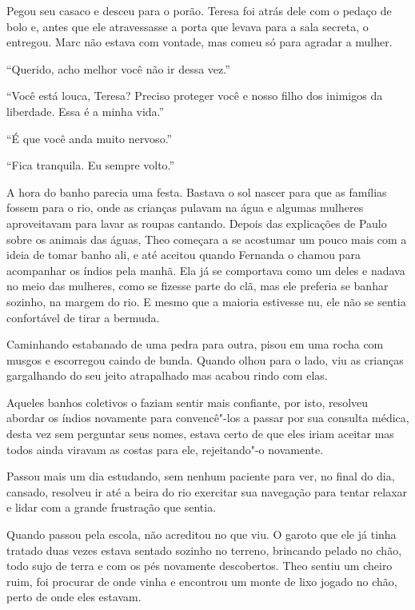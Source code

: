 Pegou seu casaco e desceu para o porão. Teresa foi atrás dele com o
pedaço de bolo e, antes que ele atravessasse a porta que levava para a
sala secreta, o entregou. Marc não estava com vontade, mas comeu só para
agradar a mulher.

``Querido, acho melhor você não ir dessa vez.''

``Você está louca, Teresa? Preciso proteger você e nosso filho dos
inimigos da liberdade. Essa é a minha vida.''

``É que você anda muito nervoso.''

``Fica tranquila. Eu sempre volto.''

\asterisc


A hora do banho parecia uma festa. Bastava o sol nascer para que as
famílias fossem para o rio, onde as crianças pulavam na água e algumas
mulheres aproveitavam para lavar as roupas cantando. Depois das
explicações de Paulo sobre os animais das águas, Theo começara a se
acostumar um pouco mais com a ideia de tomar banho ali, e até aceitou
quando Fernanda o chamou para acompanhar os índios pela manhã. Ela já se
comportava como um deles e nadava no meio das mulheres, como se fizesse
parte do clã, mas ele preferia se banhar sozinho, na margem do rio. E
mesmo que a maioria estivesse nu, ele não se sentia confortável de tirar
a bermuda.

Caminhando estabanado de uma pedra para outra, pisou em uma rocha com
musgos e escorregou caindo de bunda. Quando olhou para o lado, viu as
crianças gargalhando do seu jeito atrapalhado mas acabou rindo com elas.

Aqueles banhos coletivos o faziam sentir mais confiante, por isto,
resolveu abordar os índios novamente para convencê"-los a passar por sua
consulta médica, desta vez sem perguntar seus nomes, estava certo de que
eles iriam aceitar mas todos ainda viravam as costas para ele,
rejeitando"-o novamente.

Passou mais um dia estudando, sem nenhum paciente para ver, no final do
dia, cansado, resolveu ir até a beira do rio exercitar sua navegação
para tentar relaxar e lidar com a grande frustração que sentia.

Quando passou pela escola, não acreditou no que viu. O garoto que ele já
tinha tratado duas vezes estava sentado sozinho no terreno, brincando
pelado no chão, todo sujo de terra e com os pés novamente descobertos.
Theo sentiu um cheiro ruim, foi procurar de onde vinha e encontrou um
monte de lixo jogado no chão, perto de onde eles estavam.

